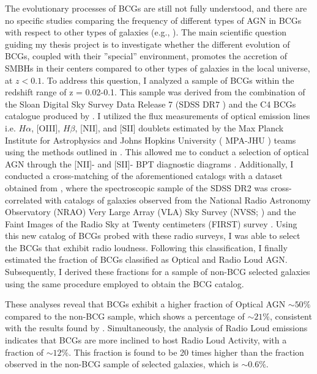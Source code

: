 The evolutionary processes of BCGs are still not fully understood, and there are no specific
studies comparing the frequency of different types of AGN in BCGs with respect to other types of
galaxies (e.g., \cite{2019CoBAO..66..153F}). The main scientific question guiding my thesis project is to
investigate whether the different evolution of BCGs, coupled with their ”special” environment,
promotes the accretion of SMBHs in their centers compared to other types of galaxies in the local
universe, at $z < 0.1$. To address this question, I analyzed a sample of BCGs within the redshift
range of z = 0.02-0.1. This sample was derived from the combination of the Sloan Digital Sky
Survey Data Release 7 (SDSS DR7 \cite{2009ApJS..182..543A}) and the
C4 BCGs catalogue produced by \cite{2007MNRAS.379..867V, 2009yCat..73790867V}. I utilized the flux measurements of optical
emission lines i.e. $H\alpha$, [OIII], $H\beta$, [NII], and [SII] doublets estimated by the Max Planck Institute for Astrophysics and Johns Hopkins University ( MPA-JHU ) teams using the methods outlined in \cite{1994ApJ...422..158O}.
This allowed me to conduct a selection of
optical AGN through the [NII]- and [SII]- BPT diagnostic diagrams  \cite{1981PASP...93....5B}.
Additionally, I conducted a cross-matching of the aforementioned catalogs with a dataset
obtained from \cite{2005MNRAS.362....9B}, where the spectroscopic sample of the SDSS DR2 was cross-correlated with catalogs of galaxies observed from the National Radio Astronomy Observatory
(NRAO) Very Large Array (VLA) Sky Survey (NVSS; \cite{1998AJ....115.1693C}) and the Faint Images of
the Radio Sky at Twenty centimeters (FIRST) survey \cite{1995ApJ...450..559B}.
Using this new catalog of BCGs probed with these radio surveys, I was able to select the BCGs
that exhibit radio loudness.
Following this classification, I finally estimated the fraction of BCGs
classified as Optical and Radio Loud AGN. Subsequently, I derived these fractions for a sample of
non-BCG selected galaxies using the same procedure employed to obtain the BCG catalog.

These analyses reveal that BCGs exhibit a higher fraction of Optical AGN $\sim50\%$ compared to the
non-BCG sample, which shows a percentage of $\sim21\%$, consistent with the results found by \cite{2012A&A...546A..17V}.
Simultaneously, the analysis of Radio Loud emissions indicates that BCGs are more
inclined to host Radio Loud Activity, with a fraction of  $\sim12\%$.
This fraction is found to be 20 times higher than the fraction observed in 
the non-BCG sample of selected galaxies, which is  $\sim0.6\%$.

